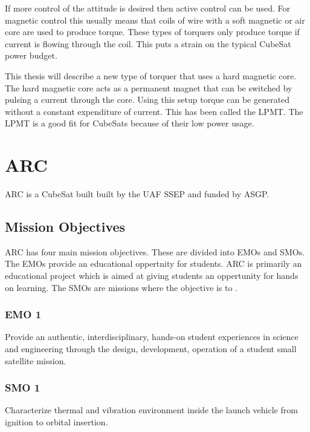If more control of the attitude is desired then active control can be used. For magnetic control this usually means that coils of wire with a soft magnetic or air core are used to produce torque. These types of torquers only produce torque if current is flowing through the coil. This puts a strain on the typical CubeSat power budget.

This thesis will describe a new type of torquer that uses a hard magnetic core. The hard magnetic core acts as a permanent magnet that can be switched by pulsing a current through the core. Using this setup torque can be generated without a constant expenditure of current. This has been called the \acf{LPMT}. The \ac{LPMT} is a good fit for CubeSats because of their low power usage.

\section{\acl{ARC}}

\ac{ARC} is a CubeSat built built by the \ac{UAF} \ac{SSEP} and funded by \ac{ASGP}. 


\subsection{Mission Objectives}


\ac{ARC} has four main mission objectives. These are divided into \acp{EMO} and \acp{SMO}. The \acp{EMO} provide an educational oppertnity for students. \ac{ARC} is primarily an educational project which is aimed at giving students an oppertunity for hands on learning. The \acp{SMO} are missions where the objective is to  \cite{ArcCdr}.

\subsubsection{\acl{EMO} 1}

Provide an authentic, interdisciplinary, hands-on student experiences in science and engineering through the design, development, operation of a student small satellite mission.

\subsubsection{\acl{SMO} 1}

Characterize thermal and vibration environment inside the launch vehicle from ignition to orbital insertion.


